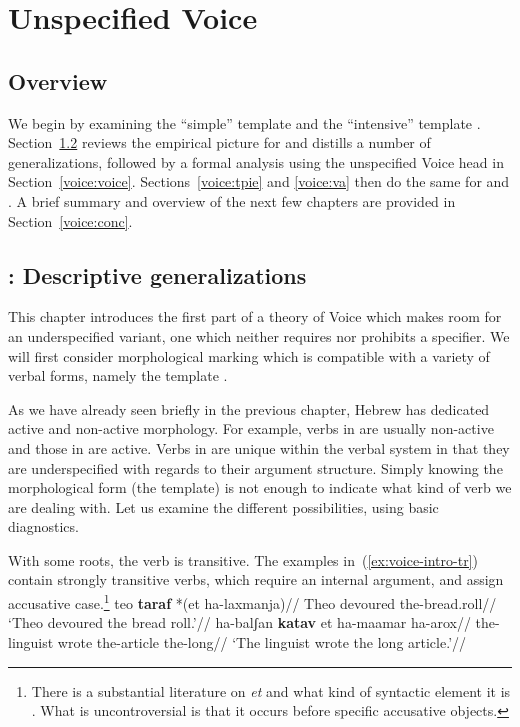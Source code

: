 \chapter{Unspecified Voice}
\label{chap:voice}

\section{Overview} \label{voice:intro}
We begin by examining the ``simple'' template {\tkal} and the ``intensive'' template {\tpie}. Section~\ref{voice:tkal} reviews the empirical picture for {\tkal} and distills a number of generalizations, followed by a formal analysis using the unspecified Voice head in Section~\ref{voice:voice}. Sections~\ref{voice:tpie} and \ref{voice:va} then do the same for {\tpie} and {\va}. A brief summary and overview of the next few chapters are provided in Section~\ref{voice:conc}.

\section{\tkal: Descriptive generalizations} \label{voice:tkal}
This chapter introduces the first part of a theory of Voice which makes room for an underspecified variant, one which neither requires nor prohibits a specifier. We will first consider morphological marking which is compatible with a variety of verbal forms, namely the template {\tkal}.

As we have already seen briefly in the previous chapter, Hebrew has dedicated active and non-active morphology. For example, verbs in {\tnif} are usually non-active and those in {\thif} are active. Verbs in {\tkal} are unique within the verbal system in that they are underspecified with regards to their argument structure. Simply knowing the morphological form (the template) is not enough to indicate what kind of verb we are dealing with. Let us examine the different possibilities, using basic diagnostics.

With some roots, the verb is transitive. The examples in~(\ref{ex:voice-intro-tr}) contain strongly transitive verbs, which require an internal argument, and assign accusative case.\footnote{There is a substantial literature on \emph{et} and what kind of syntactic element it is \citep{siloni97,danon01,borer13oup}. What is uncontroversial is that it occurs before specific accusative objects.}
\pex\label{ex:voice-intro-tr}
	\a \begingl
		\gla teo \textbf{taraf} *(et ha-laxmanja)//
		\glb Theo devoured  the-bread.roll//
		\glft `Theo devoured the bread roll.'//
	\endgl
	\a \begingl
		\gla ha-balʃan \textbf{katav} et ha-maamar ha-arox//
		\glb the-linguist wrote  the-article the-long//
		\glft `The linguist wrote the long article.'//
	\endgl
\xe

